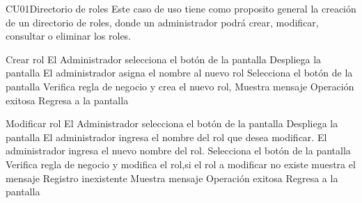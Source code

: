 
	\begin{UseCase}{CU01}{Directorio de roles}{
		Este caso de uso tiene como proposito general la creación de un directorio de roles, donde un administrador podrá crear, modificar, consultar o eliminar los roles.
	}
	\end{UseCase}
	\begin{UCtrayectoria}{Crear rol}
		\UCpaso[\UCactor] El Administrador selecciona el botón  de la pantalla 
		\UCpaso[\UCsist] Despliega la pantalla 
		\UCpaso[\UCactor] El administrador asigna el nombre al nuevo rol
		\UCpaso[\UCactor] Selecciona el botón  de la pantalla 
		\UCpaso[\UCsist] Verifica regla de negocio  y crea el nuevo rol, 
		\UCpaso[\UCsist] Muestra mensaje %
		Operación exitosa
		\UCpaso[\UCsist] Regresa a la pantalla 
	\end{UCtrayectoria}
	\begin{UCtrayectoria}{Modificar rol}
		\UCpaso[\UCactor] El Administrador selecciona el botón  de la pantalla 
		\UCpaso[\UCsist] Despliega la pantalla 
		\UCpaso[\UCactor] El administrador ingresa el nombre del rol que desea modificar.
		\UCpaso[\UCactor] El administrador ingresa el nuevo nombre del rol.
		\UCpaso[\UCactor] Selecciona el botón  de la pantalla 
		\UCpaso[\UCsist] Verifica regla de negocio  y modifica el rol,si el rol a modificar no existe muestra el mensaje %
		Registro inexistente
		\UCpaso[\UCsist] Muestra mensaje %
		Operación exitosa
		\UCpaso[\UCsist] Regresa a la pantalla 
	\end{UCtrayectoria}
